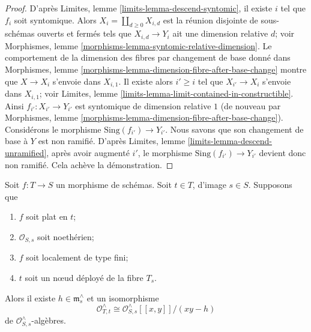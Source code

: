 \begin{proof}
D'après Limites, lemme \ref{limits-lemma-descend-syntomic}, il existe $i$ tel que $f_i$ soit syntomique. Alors $X_i = \coprod_{d \geq 0} X_{i, d}$ est la réunion disjointe de sous-schémas ouverts et fermés tels que $X_{i, d} \to Y_i$ ait une dimension relative $d$; voir Morphismes, lemme \ref{morphisms-lemma-syntomic-relative-dimension}. Le comportement de la dimension des fibres par changement de base donné dans Morphismes, lemme \ref{morphisms-lemma-dimension-fibre-after-base-change} montre que $X \to X_i$ s'envoie dans $X_{i, 1}$. Il existe alors $i' \geq i$ tel que $X_{i'} \to X_i$ s'envoie dans $X_{i, 1}$; voir Limites, lemme \ref{limits-lemma-limit-contained-in-constructible}. Ainsi $f_{i'} : X_{i'} \to Y_{i'}$ est syntomique de dimension relative $1$ (de nouveau par Morphismes, lemme \ref{morphisms-lemma-dimension-fibre-after-base-change}). Considérons le morphisme $\text{Sing}(f_{i'}) \to Y_{i'}$. Nous savons que son changement de base à $Y$ est non ramifié. D'après Limites, lemme \ref{limits-lemma-descend-unramified}, après avoir augmenté $i'$, le morphisme $\text{Sing}(f_{i'}) \to Y_{i'}$ devient donc non ramifié. Cela achève la démonstration.
\end{proof}

\begin{lemma}
\label{lemma-formal-local-structure-nodal-family}
Soit $f : T \to S$ un morphisme de schémas. Soit $t \in T$, d'image $s \in S$. Supposons que \begin{enumerate} \item $f$ soit plat en $t$; \item $\mathcal{O}_{S, s}$ soit noethérien; \item $f$ soit localement de type fini; \item $t$ soit un nœud déployé de la fibre $T_s$. \end{enumerate} Alors il existe $h \in \mathfrak m_s^\wedge$ et un isomorphisme $$
\mathcal{O}_{T, t}^\wedge \cong
\mathcal{O}_{S, s}^\wedge[[x, y]]/(xy - h)
$$ de $\mathcal{O}_{S, s}^\wedge$-algèbres.
\end{lemma}

